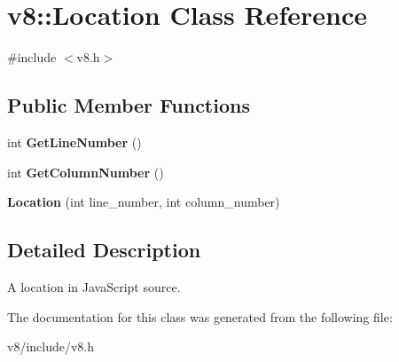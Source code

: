 \hypertarget{classv8_1_1Location}{}\section{v8\+:\+:Location Class Reference}
\label{classv8_1_1Location}


{\ttfamily \#include $<$v8.\+h$>$}

\subsection*{Public Member Functions}
\begin{DoxyCompactItemize}
\item 
\mbox{\label{classv8_1_1Location_a078f1144721e1b66a6fa55b9b56af5dc}} 
int {\bfseries Get\+Line\+Number} ()
\item 
\mbox{\label{classv8_1_1Location_ab1a7deae060562733237734a1caf9045}} 
int {\bfseries Get\+Column\+Number} ()
\item 
\mbox{\label{classv8_1_1Location_a193b270e28ce9a0825522ab46c43745c}} 
{\bfseries Location} (int line\+\_\+number, int column\+\_\+number)
\end{DoxyCompactItemize}


\subsection{Detailed Description}
A location in Java\+Script source. 

The documentation for this class was generated from the following file\+:\begin{DoxyCompactItemize}
\item 
v8/include/v8.\+h\end{DoxyCompactItemize}
